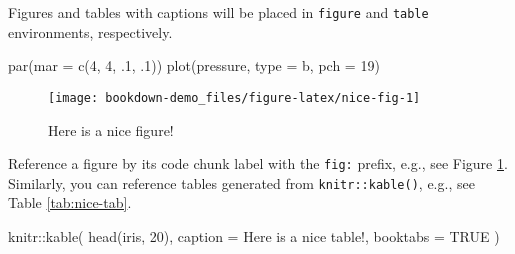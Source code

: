 \documentclass[
  openany]{book}
\newenvironment{Shaded}{\begin{snugshade}}{\end{snugshade}}
\newcommand{\AttributeTok}[1]{\textcolor[rgb]{0.77,0.63,0.00}{#1}}
\newcommand{\ConstantTok}[1]{\textcolor[rgb]{0.00,0.00,0.00}{#1}}
\newcommand{\DecValTok}[1]{\textcolor[rgb]{0.00,0.00,0.81}{#1}}
\newcommand{\FunctionTok}[1]{\textcolor[rgb]{0.00,0.00,0.00}{#1}}
\newcommand{\NormalTok}[1]{#1}
\newcommand{\SpecialCharTok}[1]{\textcolor[rgb]{0.00,0.00,0.00}{#1}}
\newcommand{\StringTok}[1]{\textcolor[rgb]{0.31,0.60,0.02}{#1}}
\begin{document}
Figures and tables with captions will be placed in \texttt{figure} and \texttt{table} environments, respectively.

\begin{Shaded}
\begin{Highlighting}[]
\FunctionTok{par}\NormalTok{(}\AttributeTok{mar =} \FunctionTok{c}\NormalTok{(}\DecValTok{4}\NormalTok{, }\DecValTok{4}\NormalTok{, .}\DecValTok{1}\NormalTok{, .}\DecValTok{1}\NormalTok{))}
\FunctionTok{plot}\NormalTok{(pressure, }\AttributeTok{type =} \StringTok{\textquotesingle{}b\textquotesingle{}}\NormalTok{, }\AttributeTok{pch =} \DecValTok{19}\NormalTok{)}
\end{Highlighting}
\end{Shaded}

\begin{figure}

{\centering \texttt{[image: bookdown-demo\_files/figure-latex/nice-fig-1]} 

}

\caption{Here is a nice figure!}\label{fig:nice-fig}
\end{figure}

Reference a figure by its code chunk label with the \texttt{fig:} prefix, e.g., see Figure \ref{fig:nice-fig}. Similarly, you can reference tables generated from \texttt{knitr::kable()}, e.g., see Table \ref{tab:nice-tab}.

\begin{Shaded}
\begin{Highlighting}[]
\NormalTok{knitr}\SpecialCharTok{::}\FunctionTok{kable}\NormalTok{(}
  \FunctionTok{head}\NormalTok{(iris, }\DecValTok{20}\NormalTok{), }\AttributeTok{caption =} \StringTok{\textquotesingle{}Here is a nice table!\textquotesingle{}}\NormalTok{,}
  \AttributeTok{booktabs =} \ConstantTok{TRUE}
\NormalTok{)}
\end{Highlighting}
\end{Shaded}
\end{document}
